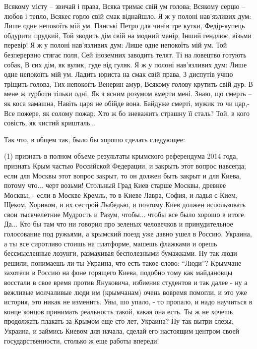 \raggedcolumns
\begin{multicols}{2} %
\setlength{\parindent}{0pt}
\obeycr
Всякому місту – звичай і права,
Всяка тримає свій ум голова;
Всякому серцю – любов і тепло,
Всякеє горло свій смак віднайшло.
Я ж у полоні нав’язливих дум:
Лише одне непокоїть мій ум.
\smallskip
Панські Петро для чинів тре кутки,
Федір-купець обдурити прудкий,
Той зводить дім свій на модний манір,
Інший гендлює, візьми перевір!
Я ж у полоні нав’язливих дум:
Лише одне непокоїть мій ум.
\smallskip
Той безперервно стягає поля,
Сей іноземних заводить телят.
Ті на ловецтво готують собак,
В сих дім, як вулик, гуде від гуляк.
Я ж у полоні нав’язливих дум:
Лише одне непокоїть мій ум.
\smallskip
Ладить юриста на смак свій права,
З диспутів учню тріщить голова,
Тих непокоїть Венерин амур,
Всякому голову крутить свій дур.
В мене ж турботи тільки одні,
Як з ясним розумом вмерти мені.
\smallskip
Знаю, що смерть – як коса замашна,
Навіть царя не обійде вона.
Байдуже смерті, мужик то чи цар,-
Все пожере, як солому пожар.
Хто ж бо зневажить страшну її сталь?
Той, в кого совість, як чистий кришталь...
\restorecr
\end{multicols} %

Так что, в общем так, было бы хорошо сделать следующее:

(1) признать в полном объеме результаты крымского референдума 2014 года,
признать Крым частью Российской Федерации, и закрыть этот вопрос навсегда; если
для Москвы этот вопрос закрыт, то он должен быть закрыт и для Киева, потому
что...  черт возьми! Стольный Град Киев старше Москвы, древнее Москвы, - если в
Москве Кремль, то в Киеве Лавра, София, и ладья с Кием, Щеком, Хоривом, и их
сестрой Лыбедью, и поэтому Киев должен использовать свои тысячелетние Мудрость
и Разум, чтобы... чтобы все было хорошо в итоге.  Да... Кто бы там что ни
говорил про зеленых человечков и принудительное голосование под ружьями, а
крымский поезд уже давно ушел в Россию, Украина, а ты все сиротливо стоишь на
платформе, машешь флажками и орешь бессмысленные лозунги, размахивая
бесполезными бумажками. Ну так люди решили, понимаешь ли ты Украина, что есть
такое слово: \enquote{Люди}? Крымчане захотели в Россию на фоне горящего Киева,
подобно тому как майдановцы восстали в свое время против Януковича, избиения
студентов и так далее - ну а вежливые молчаливые люди им (крымчанам) очень
вовремя помогли, и это уже история, это никак не изменить. Увы, шо упало, - то
пропало, и надо научиться в конце концов принимать реальность такой, какая она
есть. Ты ж не хочешь продолжать плакать за Крымом еще сто лет, Украина? Ну так
вытри слезы, Украина, и займись Киевом для начала, сделай его настоящим центром
своей государственности, столько ж еще работы впереди!

